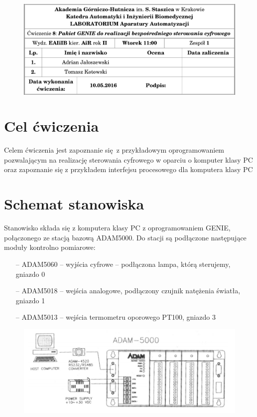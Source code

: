 \documentclass[a4paper, 12pt]{article}
\begin{document}
	\begin{figure}[H]
		\centering
		\includegraphics[width = \textwidth]{./img/cudo.png}
	\end{figure}
	\section{Cel ćwiczenia}
		Celem ćwiczenia jest zapoznanie się z przykładowym oprogramowaniem pozwalającym na realizację sterowania cyfrowego w oparciu o komputer klasy PC oraz zapoznanie się z przykładem interfejsu procesowego dla komputera klasy PC
	\section{Schemat stanowiska}
		Stanowisko składa się z komputera klasy PC z oprogramowaniem GENIE, połączonego ze stacją bazową ADAM5000. Do stacji są podłączone następujące moduły kontrolno pomiarowe:
		\begin{itemize}
			\item[--] ADAM5060 -- wyjścia cyfrowe -- podłączona lampa, którą sterujemy, gniazdo 0
			\item[--] ADAM5018 -- wejścia analogowe, podłączony czujnik natężenia światła, gniazdo 1
			\item[--] ADAM5013 -- wejścia termometru oporowego PT100, gniazdo 3
		\end{itemize}
		\begin{figure}[H]
			\centering
			\includegraphics[width = \textwidth]{./img/adam.png}
		\end{figure}
\end{document}
